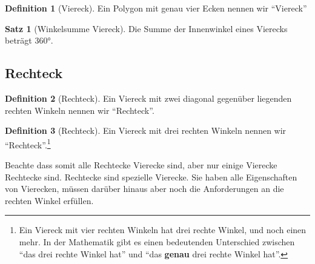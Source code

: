 \documentclass[a4paper]{book}%
\theoremstyle{definition}
\newtheorem{definition}{Definition}
\newtheorem{satz}{Satz}
\begin{document}
\begin{definition}[Viereck]
    Ein Polygon mit genau vier Ecken nennen wir \enquote{Viereck}
\end{definition}

\begin{satz}[Winkelsumme Viereck]\label{satz:WinkelsummeViereck}
    Die Summe der Innenwinkel eines Vierecks beträgt 360°.
\end{satz}


\subsection{Rechteck}\label{Rechteck}

\begin{definition}[Rechteck]\label{def:Rechteck01}
    Ein Viereck mit zwei diagonal gegenüber liegenden rechten Winkeln nennen wir \enquote{Rechteck}.
\end{definition}

\begin{definition}[Rechteck]\label{def:Rechteck02}
    Ein Viereck mit drei rechten Winkeln nennen wir \enquote{Rechteck}.\footnote{Ein Viereck mit vier rechten Winkeln hat drei rechte Winkel, und noch einen mehr. In der Mathematik gibt es einen bedeutenden Unterschied zwischen \enquote{das drei rechte Winkel hat} und \enquote{das \textbf{genau} drei rechte Winkel hat}.}
\end{definition}

Beachte dass somit alle Rechtecke Vierecke sind, aber nur einige Vierecke Rechtecke sind. Rechtecke sind spezielle Vierecke. Sie haben alle Eigenschaften von Vierecken, müssen darüber hinaus aber noch die Anforderungen an die rechten Winkel erfüllen.
\end{document}
